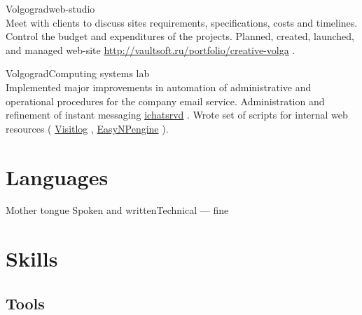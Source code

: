 \documentclass[10pt,a4paper]{moderncv}
\begin{document}
    {Volgograd}{web-studio}{\\ Meet with clients to discuss sites requirements, specifications, costs and timelines. Control the budget and expenditures of the projects. Planned, created, launched, and managed web-site  \href{http://vaultsoft.ru/portfolio/creative-volga}{http://vaultsoft.ru/portfolio/creative-volga} . \newline{}
    }
      
      
      
    {Volgograd}{Computing systems lab}{\\Implemented major improvements in automation of administrative and operational procedures for the company email service. 
        Administration and refinement of instant messaging  \href{http://vaultsoft.ru/portfolio/ichatsrvd}{ichatsrvd} . Wrote set of scripts for internal web resources ( \href{http://vaultsoft.ru/portfolio/visitlog}{Visitlog} ,  \href{http://vaultsoft.ru/portfolio/easynpengine}{EasyNPengine} ).\newline{}
    }
      
      
       
      
    
    
    
  
    \section{Languages}
    {Mother tongue}{\hfill}
    {Spoken and written}{Technical --- fine\hfill}
  \section{Skills}
    \subsection{Tools}
    
\end{document}
